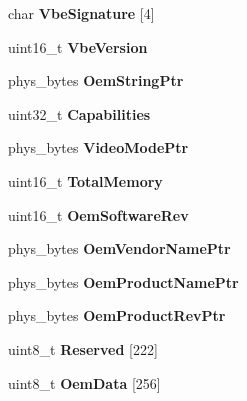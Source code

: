 \begin{DoxyCompactItemize}
\item 
\hypertarget{group__vbe_gafd3a8744ce19caa07755c2604cce884c}{}char {\bfseries Vbe\+Signature} \mbox{[}4\mbox{]}\label{group__vbe_gafd3a8744ce19caa07755c2604cce884c}

\item 
\hypertarget{group__vbe_ga7b9fef89774326b46f9481cbd9a397d3}{}uint16\+\_\+t {\bfseries Vbe\+Version}\label{group__vbe_ga7b9fef89774326b46f9481cbd9a397d3}

\item 
\hypertarget{group__vbe_ga20ab55e9dda8d437875255529c1cffe8}{}phys\+\_\+bytes {\bfseries Oem\+String\+Ptr}\label{group__vbe_ga20ab55e9dda8d437875255529c1cffe8}

\item 
\hypertarget{group__vbe_gaf005ca0116fa8ac69ef6198824f4d659}{}uint32\+\_\+t {\bfseries Capabilities}\label{group__vbe_gaf005ca0116fa8ac69ef6198824f4d659}

\item 
\hypertarget{group__vbe_ga9d989fdbcdad6a40c10fc28c0f9af760}{}phys\+\_\+bytes {\bfseries Video\+Mode\+Ptr}\label{group__vbe_ga9d989fdbcdad6a40c10fc28c0f9af760}

\item 
\hypertarget{group__vbe_ga3e7b41e709394a10b3667e7f27f1aa7a}{}uint16\+\_\+t {\bfseries Total\+Memory}\label{group__vbe_ga3e7b41e709394a10b3667e7f27f1aa7a}

\item 
\hypertarget{group__vbe_ga133984a56ec19abf4fcb2e6ae71d6498}{}uint16\+\_\+t {\bfseries Oem\+Software\+Rev}\label{group__vbe_ga133984a56ec19abf4fcb2e6ae71d6498}

\item 
\hypertarget{group__vbe_gaffd3a330afde841405f89bbcd05af4f0}{}phys\+\_\+bytes {\bfseries Oem\+Vendor\+Name\+Ptr}\label{group__vbe_gaffd3a330afde841405f89bbcd05af4f0}

\item 
\hypertarget{group__vbe_gafd3d28c2078a683b1ed64ea21905fcfe}{}phys\+\_\+bytes {\bfseries Oem\+Product\+Name\+Ptr}\label{group__vbe_gafd3d28c2078a683b1ed64ea21905fcfe}

\item 
\hypertarget{group__vbe_ga239cba41d0489da5b79556b45797c6b0}{}phys\+\_\+bytes {\bfseries Oem\+Product\+Rev\+Ptr}\label{group__vbe_ga239cba41d0489da5b79556b45797c6b0}

\item 
\hypertarget{group__vbe_ga2c3b1cbb6bad5c51d4be4e57255a61d2}{}uint8\+\_\+t {\bfseries Reserved} \mbox{[}222\mbox{]}\label{group__vbe_ga2c3b1cbb6bad5c51d4be4e57255a61d2}

\item 
\hypertarget{group__vbe_ga966ae75c33c2d65b4f0c916f093acac0}{}uint8\+\_\+t {\bfseries Oem\+Data} \mbox{[}256\mbox{]}\label{group__vbe_ga966ae75c33c2d65b4f0c916f093acac0}

\end{DoxyCompactItemize}


